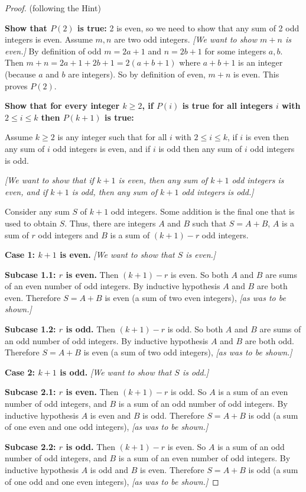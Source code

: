 \documentclass[14pt]{extarticle}
\begin{document}
\begin{proof}
    (following the Hint)

    {\bf Show that $P(2)$ is true:} 2 is even, so we need to show that any sum of 2 odd integers is even. Assume $m, n$ are two odd integers.
        {\it [We want to show $m+n$ is even.]}
    By definition of odd $m = 2a+1$ and $n = 2b+1$ for some integers $a,b$.
    Then $m+n = 2a+1 + 2b + 1 = 2(a+b+1)$ where $a+b+1$ is an integer (because $a$ and $b$ are integers).
    So by definition of even, $m+n$ is even. This proves $P(2)$.

        {\bf Show that for every integer $k \geq 2$, if $P(i)$ is true for all integers $i$ with $2 \leq i \leq k$ then $P(k+1)$ is true:}

    Assume $k \geq 2$ is any integer such that for all $i$ with $2 \leq i \leq k$, if $i$ is even then any sum of $i$ odd integers is even, and if $i$ is odd then any sum of $i$ odd integers is odd.

        {\it [We want to show that if $k+1$ is even, then any sum of $k+1$ odd integers is even, and if $k+1$ is odd, then any sum of $k+1$ odd integers is odd.]}

    Consider any sum $S$ of $k+1$ odd integers.
    Some addition is the final one that is used to obtain $S$.
    Thus, there are integers $A$ and $B$ such that $S = A + B$,
    $A$ is a sum of $r$ odd integers and $B$ is a sum of $(k + 1) - r$ odd integers.

        {\bf Case 1: $k+1$ is even.} {\it [We want to show that $S$ is even.]}

        {\bf Subcase 1.1: $r$ is even.}
    Then $(k+1) - r$ is even. So both $A$ and $B$ are sums of an even number of odd integers.
    By inductive hypothesis $A$ and $B$ are both even.
    Therefore $S = A + B$ is even (a sum of two even integers),
    {\it [as was to be shown.]}

        {\bf Subcase 1.2: $r$ is odd.}
    Then $(k+1) - r$ is odd. So both $A$ and $B$ are sums of an odd number of odd integers.
    By inductive hypothesis $A$ and $B$ are both odd.
    Therefore $S = A + B$ is even (a sum of two odd integers),
    {\it [as was to be shown.]}

        {\bf Case 2: $k+1$ is odd.} {\it [We want to show that $S$ is odd.]}

        {\bf Subcase 2.1: $r$ is even.}
    Then $(k+1) - r$ is odd.
    So $A$ is a sum of an even number of odd integers, and
    $B$ is a sum of an odd number of odd integers.
    By inductive hypothesis $A$ is even and $B$ is odd.
    Therefore $S = A + B$ is odd
    (a sum of one even and one odd integers),
    {\it [as was to be shown.]}

        {\bf Subcase 2.2: $r$ is odd.}
    Then $(k+1) - r$ is even.
    So $A$ is a sum of an odd number of odd integers, and
    $B$ is a sum of an even number of odd integers.
    By inductive hypothesis $A$ is odd and $B$ is even.
    Therefore $S = A + B$ is odd
    (a sum of one odd and one even integers),
    {\it [as was to be shown.]}
\end{proof}
\end{document}
